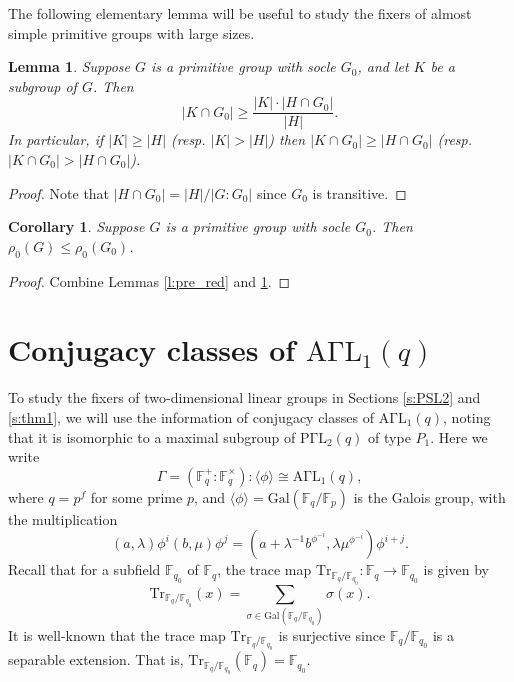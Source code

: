 \documentclass[twoside,a4paper,reqno,11pt]{amsart}
\newcommand{\<}{\langle}
\renewcommand{\>}{\rangle}
\newcommand{\la}{\langle}
\newcommand{\ra}{\rangle}
\renewcommand{\to}{\rightarrow}
\newcommand{\leqs}{\leqslant}
\newcommand{\geqs}{\geqslant}
\newcommand{\PGammaL}{\mathrm{P\Gamma L}}
\newcommand{\Tr}{\mathrm{Tr}}
\newtheorem{lem}[thm]{Lemma}
\newtheorem{cor}[thm]{Corollary}
\theoremstyle{definition}
\begin{document}
	The following elementary lemma will be useful to study the fixers of almost simple primitive groups with large sizes.
	
	\begin{lem}
		\label{l:pre_as_size}
		Suppose $G$ is a primitive group with socle $G_0$, and let $K$ be a subgroup of $G$. Then
		\begin{equation*}
		|K\cap G_0|\geqs \frac{|K|\cdot |H\cap G_0|}{|H|}.
		\end{equation*}
		In particular, if $|K|\geqs |H|$ (resp. $|K| > |H|$) then $|K\cap G_0|\geqs |H\cap G_0|$ (resp. $|K\cap G_0| > |H\cap G_0|$).
	\end{lem}
	
	\begin{proof}
		Note that $|H\cap G_0| = |H|/|G:G_0|$ since $G_0$ is transitive.
	\end{proof}
	
	\begin{cor}
		\label{c:pre_as_size}
		Suppose $G$ is a primitive group with socle $G_0$. Then $\rho_0(G)\leqs \rho_0(G_0)$.
	\end{cor}
	
	\begin{proof}
		Combine Lemmas \ref{l:pre_red} and \ref{l:pre_as_size}.
	\end{proof}
	
	
	\section{Conjugacy classes of $\mathrm{A\Gamma L}_1(q)$}
	
	\label{s:AGammaL}
	
	To study the fixers of two-dimensional linear groups in Sections \ref{s:PSL2} and \ref{s:thm1}, we will use the information of conjugacy classes of $\mathrm{A\Gamma L}_1(q)$, noting that it is isomorphic to a maximal subgroup of $\PGammaL_2(q)$ of type $P_1$. Here we write
	\begin{equation}
	\label{e:Gamma}
	\Gamma = (\mathbb{F}_q^+{:}\mathbb{F}_q^\times){:}\la \phi\ra\cong\mathrm{A\Gamma L}_1(q),
	\end{equation}
	where $q = p^f$ for some prime $p$, and $\la\phi\ra = \mathrm{Gal}(\mathbb{F}_q/\mathbb{F}_p)$ is the Galois group, with the multiplication
	\begin{equation*}
	(a,\lambda)\phi^i(b,\mu)\phi^j = (a+\lambda^{-1}b^{\phi^{-i}},\lambda\mu^{\phi^{-i}})\phi^{i+j}.
	\end{equation*}
	Recall that for a subfield $\mathbb{F}_{q_0}$ of $\mathbb{F}_q$, the trace map $\mathrm{Tr}_{\mathbb{F}_q/\mathbb{F}_{q_0}}:\mathbb{F}_q\to\mathbb{F}_{q_0}$ is given by
	\begin{equation*}
	\Tr_{\mathbb{F}_q/\mathbb{F}_{q_0}}(x) = \sum_{\sigma\in\mathrm{Gal}(\mathbb{F}_q/\mathbb{F}_{q_0})}\sigma(x).
	\end{equation*}
	It is well-known that the trace map $\mathrm{Tr}_{\mathbb{F}_q/\mathbb{F}_{q_0}}$ is surjective since $\mathbb{F}_q/\mathbb{F}_{q_0}$ is a separable extension. That is, $\Tr_{\mathbb{F}_q/\mathbb{F}_{q_0}}(\mathbb{F}_q) = \mathbb{F}_{q_0}$.
	
\end{document}
